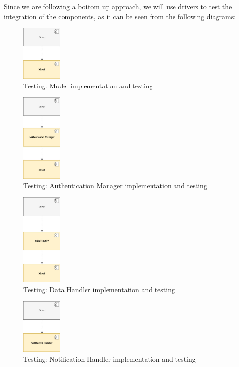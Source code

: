 \documentclass[10pt]{report}
\begin{document}
Since we are following a bottom up approach, we will use drivers to test the integration of the components,
as it can be seen from the following diagrams:
\\
\begin{figure}[H]
    \centering
    \includegraphics[width=75px]{Testing/T_01.jpg}
    \caption{Testing: Model implementation and testing}
\end{figure}

\begin{figure}[H]
    \centering
    \includegraphics[width=75px]{Testing/T_02.jpg}
    \caption{Testing: Authentication Manager implementation and testing}
\end{figure}

\begin{figure}[H]
    \centering
    \includegraphics[width=75px]{Testing/T_03.jpg}
    \caption{Testing: Data Handler implementation and testing}
\end{figure}

\begin{figure}[H]
    \centering
    \includegraphics[width=75px]{Testing/T_04.jpg}
    \caption{Testing: Notification Handler implementation and testing}
\end{figure}
\end{document}

